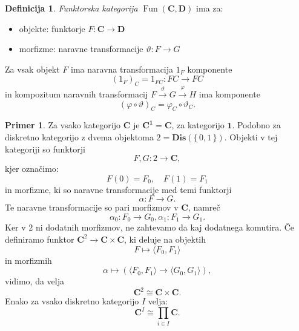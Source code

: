 \documentclass[12pt,a4paper]{book}
\theoremstyle{definition}
\newtheorem{definicija}{Definicija}[chapter]
\theoremstyle{plain}
\theoremstyle{definition}
\newtheorem{primer}{Primer}[section]
\theoremstyle{remark}
\newcommand{\cat}[1]{\textbf{#1}}
\DeclareMathOperator{\Fun}{Fun}
\renewcommand{\set}[1]{\{\,#1\,\}}
\newcommand{\fprod}[1]{\langle #1 \rangle}
\begin{document}
\begin{definicija}
\emph{Funktorska kategorija} $\Fun(\cat{C}, \cat{D})$ ima za:
\begin{itemize}
\item objekte: funktorje $F : \cat{C} \to \cat{D}$
\item morfizme: naravne transformacije $\vartheta : F \to G$
\end{itemize}
Za vsak objekt $F$ ima naravna transformacija $1_F$ komponente
$$ (1_F)_C = 1_{FC} : FC \to FC$$
in kompozitum naravnih transformacij $F \xrightarrow{\vartheta} G \xrightarrow{\varphi} H$
ima komponente
$$ (\varphi \circ \vartheta)_C = \varphi_C \circ \vartheta_C.$$
\end{definicija}

\begin{primer}
Za vsako kategorijo $\cat{C}$ je $\cat{C}^\cat{1} = \cat{C}$, za kategorijo $\cat{1}$. Podobno za diskretno kategorijo z dvema objektoma $2 = \cat{Dis}(\set{0,1})$.
Objekti v tej kategoriji so funktorji
$$F,G : 2 \to \cat{C},$$
kjer označimo:
$$F(0) = F_0, \quad F(1) = F_1$$
in morfizme, ki so naravne transformacije med temi funktorji
$$\alpha: F \to G.$$
Te naravne transformacije so pari morfizmov v $\cat{C}$, namreč
$$\alpha_0 : F_0 \to G_0, \alpha_1 : F_1 \to G_1.$$
Ker v $2$ ni dodatnih morfizmov, ne zahtevamo da kaj dodatnega komutira.
Če definiramo funktor $\cat{C}^2 \to \cat{C} \times \cat{C}$, ki deluje na objektih
$$F \mapsto \fprod{F_0,F_1}$$
in morfizmih
$$\alpha \mapsto (\fprod{F_0,F_1} \to \fprod{G_0,G_1}),$$
vidimo, da velja
$$\cat{C}^2 \cong \cat{C} \times \cat{C}.$$
Enako za vsako diskretno kategorijo $I$ velja:
$$\cat{C}^I \cong \prod_{i \in I}\cat{C}.$$

\end{primer}
\end{document}

